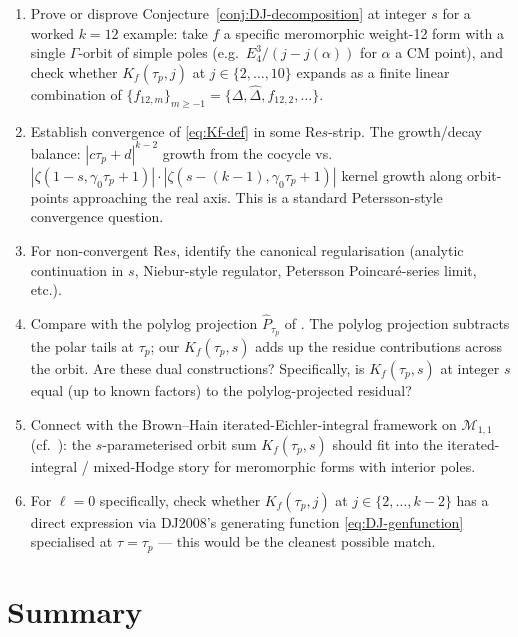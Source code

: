 \documentclass[11pt]{article}
\newcommand{\re}{\mathrm{Re}}
\newcommand{\Dhat}{\widehat{\Delta}}
\begin{document}
\begin{enumerate}\itemsep0.3em
\item Prove or disprove Conjecture~\ref{conj:DJ-decomposition} at
  integer $s$ for a worked $k = 12$ example: take $f$ a specific
  meromorphic weight-12 form with a single $\Gamma$-orbit of simple
  poles (e.g.\ $E_4^3/(j - j(\alpha))$ for $\alpha$ a CM point), and
  check whether $K_f(\tau_p, j)$ at $j \in \{2, \ldots, 10\}$ expands
  as a finite linear combination of $\{f_{12, m}\}_{m \ge -1} =
  \{\Delta, \Dhat, f_{12, 2}, \ldots\}$.

\item Establish convergence of \eqref{eq:Kf-def} in some
  $\re s$-strip.  The growth/decay balance: $|c\tau_p + d|^{k - 2}$
  growth from the cocycle vs.\ $|\zeta(1-s, \gamma_0\tau_p +
  1)| \cdot |\zeta(s-(k-1), \gamma_0\tau_p + 1)|$ kernel growth
  along orbit-points approaching the real axis.  This is a standard
  Petersson-style convergence question.

\item For non-convergent $\re s$, identify the canonical
  regularisation (analytic continuation in $s$, Niebur-style
  regulator, Petersson Poincar\'e-series limit, etc.).

\item Compare with the polylog projection $\widehat{P}_{\tau_p}$ of
  \cite[\S2.2]{1806}.  The polylog projection subtracts the polar
  tails at $\tau_p$; our $K_f(\tau_p, s)$ adds up the residue
  contributions across the orbit.  Are these dual constructions?
  Specifically, is $K_f(\tau_p, s)$ at integer $s$ equal (up to known
  factors) to the polylog-projected residual?

\item Connect with the Brown--Hain iterated-Eichler-integral framework
  on $\mathcal{M}_{1, 1}$ (cf.\ \cite{Brown2017}): the
  $s$-parameterised orbit sum $K_f(\tau_p, s)$ should fit into the
  iterated-integral / mixed-Hodge story for meromorphic forms with
  interior poles.

\item For $\ell = 0$ specifically, check whether $K_f(\tau_p, j)$ at
  $j \in \{2, \ldots, k-2\}$ has a direct expression via DJ2008's
  generating function \eqref{eq:DJ-genfunction} specialised at
  $\tau = \tau_p$ — this would be the cleanest possible match.
\end{enumerate}

\section{Summary}
\end{document}
